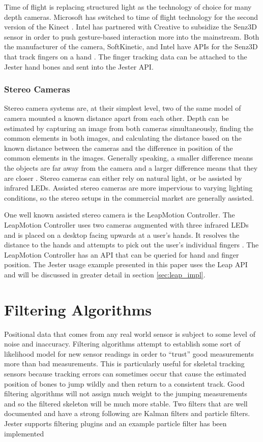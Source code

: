 Time of flight is replacing structured light as the technology of choice for many depth cameras. Microsoft has switched to time of flight technology for the second version of the Kinect \cite{kinect2}. Intel has partnered with Creative to subsidize the Senz3D sensor in order to push gesture-based interaction more into the mainstream. Both the manufacturer of the camera, SoftKinetic, and Intel have APIs for the Senz3D that track fingers on a hand \cite{senz3d}. The finger tracking data can be attached to the Jester hand bones and sent into the Jester API.

\subsubsection{Stereo Cameras}

Stereo camera systems are, at their simplest level, two of the same model of camera mounted a known distance apart from each other. Depth can be estimated by capturing an image from both cameras simultaneously, finding the common elements in both images, and calculating the distance based on the known distance between the cameras and the difference in position of the common elements in the images. Generally speaking, a smaller difference means the objects are far away from the camera and a larger difference means that they are closer \cite{lucas1981iterative}. Stereo cameras can either rely on natural light, or be assisted by infrared LEDs. Assisted stereo cameras are more impervious to varying lighting conditions, so the stereo setups in the commercial market are generally assisted.

One well known assisted stereo camera is the LeapMotion Controller. The LeapMotion Controller uses two cameras augmented with three infrared LEDs and is placed on a desktop facing upwards at a user’s hands. It resolves the distance to the hands and attempts to pick out the user’s individual fingers \cite{weichert2013analysis}. The LeapMotion Controller has an API that can be queried for hand and finger position. The Jester usage example presented in this paper uses the Leap API and will be discussed in greater detail in section \ref{sec:leap_impl}.

\section{Filtering Algorithms}\label{sec:filter_back}

Positional data that comes from any real world sensor is subject to some level of noise and inaccuracy. Filtering algorithms attempt to establish some sort of likelihood model for new sensor readings in order to “trust” good measurements more than bad measurements. This is particularly useful for skeletal tracking sensors because tracking errors can sometimes occur that cause the estimated position of bones to jump wildly and then return to a consistent track. Good filtering algorithms will not assign much weight to the jumping measurements and so the filtered skeleton will be much more stable. Two filters that are well documented and have a strong following are Kalman filters and particle filters. Jester supports filtering plugins and an example particle filter has been implemented

